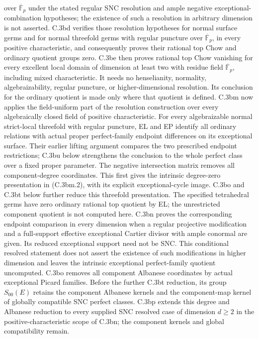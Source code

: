 over $\overline{\mathbb F}_p$ under the stated regular SNC
resolution and ample negative exceptional-combination hypotheses;
the existence of such a resolution in arbitrary dimension is
not asserted. C.3bd verifies those resolution hypotheses for
normal surface germs and for normal threefold germs with regular
puncture over $\overline{\mathbb F}_p$, in every positive
characteristic, and consequently proves their rational top
Chow and ordinary quotient groups zero.
C.3be then proves rational top Chow vanishing for every excellent
local domain of dimension at least two with residue
field $\overline{\mathbb F}_p$, including mixed characteristic.
It needs no henselianity, normality, algebraizability, regular puncture, or
higher-dimensional resolution. Its conclusion for the ordinary
quotient is made only where that quotient is defined.
C.3bm now applies the field-uniform part of the resolution construction
over every algebraically closed field of positive characteristic.
For every algebraizable normal strict-local threefold with regular puncture,
EL and EP identify all ordinary relations with actual proper perfect-family
endpoint differences on its exceptional surface. Their earlier lifting
argument compares the two prescribed endpoint restrictions; C.3bu below
strengthens the conclusion to the whole perfect class over a fixed proper
parameter. The negative intersection matrix removes
all component-degree coordinates. This first gives the intrinsic
degree-zero presentation in (C.3bm.2), with its explicit exceptional-cycle
image. C.3bo and C.3bt below further reduce this threefold presentation.
The specified tetrahedral germs have zero ordinary rational top quotient
by EL; the unrestricted component quotient is not computed here.
C.3bn proves the corresponding endpoint comparison in every dimension
when a regular projective modification and a full-support effective
exceptional Cartier divisor with ample conormal are given. Its reduced
exceptional support need not be SNC. This conditional resolved statement
does not assert the existence of such modifications in higher dimension
and leaves the intrinsic exceptional perfect-family quotient uncomputed.
C.3bo removes all component Albanese coordinates by actual exceptional
Picard families. Before the further C.3bt reduction, its group
$S_{00}(E)$ retains the component Albanese kernels and the component-map
kernel of globally compatible SNC perfect classes.
C.3bp extends this degree and Albanese reduction to every supplied SNC
resolved case of dimension $d\ge2$ in the positive-characteristic scope
of C.3bn; the component kernels and global compatibility remain.
